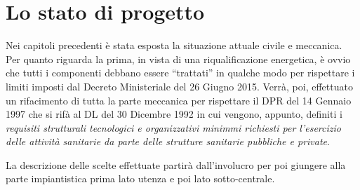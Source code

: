 \chapter{Lo stato di progetto}
\thispagestyle{empty}
Nei capitoli precedenti è stata esposta la situazione attuale civile e meccanica. Per quanto riguarda la prima, in vista di una riqualificazione energetica, è ovvio che tutti i componenti debbano essere ``trattati'' in qualche modo per rispettare i limiti imposti dal Decreto Ministeriale del 26 Giugno 2015. Verrà, poi, effettuato un rifacimento di tutta la parte meccanica per rispettare il DPR del 14 Gennaio 1997 che si rifà al DL del 30 Dicembre 1992 in cui vengono, appunto, definiti i \emph{requisiti strutturali tecnologici e organizzativi minimmi richiesti per l'esercizio delle attività sanitarie da parte delle strutture sanitarie pubbliche e private}.

La descrizione delle scelte effettuate partirà dall'involucro per poi giungere alla parte impiantistica prima lato utenza e poi lato sotto-centrale.

